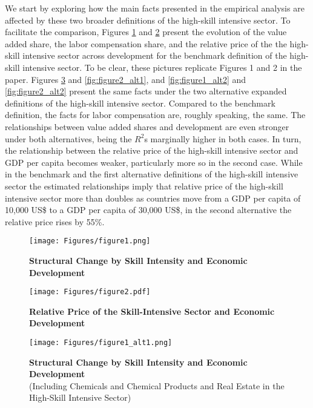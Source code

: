 \documentclass[10pt]{article}
\begin{document}
We start by exploring how the main facts presented in the empirical analysis are affected by these two broader definitions of the high-skill intensive sector. To facilitate the comparison, Figures \ref{fig:figure1} and \ref{fig:figure2} present the evolution of the value added share, the labor compensation share, and the relative price of the the high-skill intensive sector across development for the benchmark definition of the high-skill intensive sector. To be clear, these pictures replicate Figures 1 and 2 in the paper. Figures \ref{fig:figure1_alt1} and \ref{fig:figure2_alt1}, and \ref{fig:figure1_alt2} and \ref{fig:figure2_alt2} present the same facts under the two alternative expanded definitions of the high-skill intensive sector. Compared to the benchmark definition, the facts for labor compensation are, roughly speaking, the same. The relationships between value added shares and development are even stronger under both alternatives, being the $R^{2}$s marginally higher in both cases. In turn, the relationship between the relative price of the high-skill intensive sector and GDP per capita becomes weaker, particularly more so in the second case. While in the benchmark and the first alternative definitions of the high-skill intensive sector the estimated relationships imply that relative price of the high-skill intensive sector more than doubles as countries move from a GDP per capita of 10,000 US\$ to a GDP per capita of 30,000 US\$, in the second alternative the relative price rises by 55\%.\\ 

\begin{figure}[!h] 
\caption{\centering \textbf{Structural Change by Skill Intensity and Economic Development}}
\centering
\texttt{[image: Figures/figure1.png]}
\label{fig:figure1}
\end{figure}

\begin{figure}[!h] 
\caption{\centering \textbf{Relative Price of the Skill-Intensive Sector and Economic Development}}
\centering
\texttt{[image: Figures/figure2.pdf]}
\label{fig:figure2}
\end{figure}

\begin{figure}[!h] 
\caption{\centering \textbf{Structural Change by Skill Intensity and Economic Development} \\ (Including Chemicals and Chemical Products and Real Estate in the High-Skill Intensive Sector)}
\centering
\texttt{[image: Figures/figure1\_alt1.png]}
\label{fig:figure1_alt1}
\end{figure}
\end{document}
